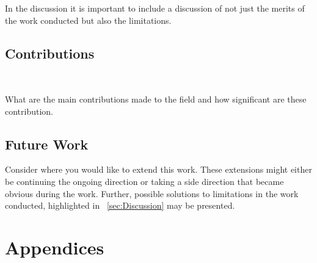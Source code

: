 \documentclass[a4paper]{book}
\begin{document}
In the discussion it is important to include a discussion of not just the merits of the work conducted but also the limitations.

\section{Contributions}~\label{cont}
\label{sec:Contributions}

What are the main contributions made to the field and how significant are these contribution.

\section{Future Work}
\label{sec:futureWork}

Consider where you would like to extend this work. These extensions might either be continuing the ongoing direction or taking a side direction that became obvious during the work. Further, possible solutions to limitations in the work conducted, highlighted in ~\ref{sec:Discussion} may be presented.

\backmatter



\chapter{Appendices}
\label{cha:appendices}
\end{document}

